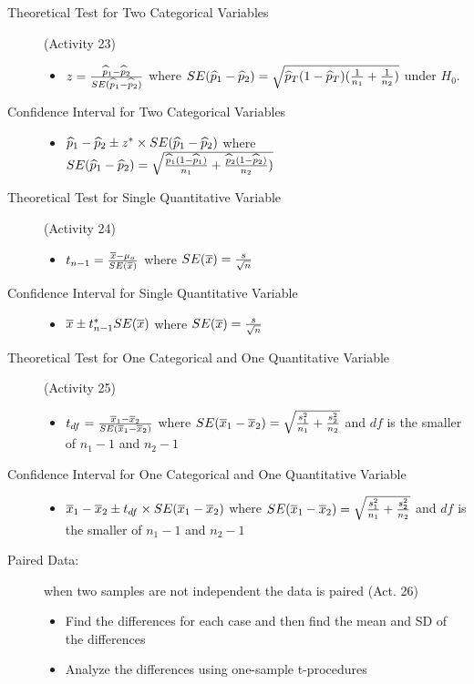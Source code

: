 \begin{description}
\item [Theoretical Test for Two Categorical Variables] (Activity 23)
  \begin{itemize}
  \item $z = \frac{\widehat{p}_1 - \widehat{p}_2}{SE(\widehat{p}_1-\widehat{p}_2)}$ where 
    $SE(\widehat{p}_1 - \widehat{p}_2) =
    \sqrt{\widehat{p}_T(1-\widehat{p}_T)(\frac{1}{n_1} + \frac{1}{n_2})}$ under $H_0$.
  \end{itemize}
\item [Confidence Interval for Two Categorical Variables]
   \begin{itemize}
  \item $\widehat{p}_1 - \widehat{p}_2 \pm z^*\times SE(\widehat{p}_1-\widehat{p}_2)$ where
    $SE(\widehat{p}_1 - \widehat{p}_2) = \sqrt{\frac{\widehat{p}_1(1-\widehat{p}_1)}{n_1} + \frac{\widehat{p}_2(1-\widehat{p}_2)}{n_2})}$ 
  \end{itemize}
\item [Theoretical Test for Single Quantitative Variable] (Activity
  24)
  \begin{itemize}
  \item $t_{n-1} = \frac{\overline{x} -\mu_o}{SE(\overline{x})} $ where $SE(\overline{x}) = \frac{s}{\sqrt{n}}$
  \end{itemize}
\item [Confidence Interval for Single Quantitative Variable]
  \begin{itemize}
  \item $\overline{x} \pm t^*_{n-1} SE(\overline{x})$ where $SE(\overline{x}) = \frac{s}{\sqrt{n}}$
  \end{itemize}

\item [Theoretical Test for One Categorical and One Quantitative
  Variable] (Activity 25)
  \begin{itemize}
  \item $t_{df} = \frac{\overline{x}_1 -\overline{x}_2}{SE(\overline{x}_1-\overline{x}_2)} $ where
    $SE(\overline{x}_1-\overline{x}_2) = \sqrt{\frac{s_1^2}{n_1} +
      \frac{s_2^2}{n_2}}$ and $df$ is the 
      smaller of $n_1-1$ and $n_2-1$
  \end{itemize}

\item [Confidence Interval for One Categorical and One Quantitative
  Variable]
  \begin{itemize}
  \item $\overline{x}_1 -\overline{x}_2 \pm t_{df}\times SE(\overline{x}_1-\overline{x}_2) $ where
    $SE(\overline{x}_1-\overline{x}_2) = \sqrt{\frac{s_1^2}{n_1} +
      \frac{s_2^2}{n_2}}$ and $df$ is the smaller of $n_1-1$ and $n_2-1$
  \end{itemize}


\item [Paired Data:] when two samples are not independent the data is
  paired (Act. 26) 
  \begin{itemize}
  \item Find the differences for each case and then find the mean and
    SD of the differences 
  \item Analyze the differences using one-sample t-procedures
  \end{itemize}
\end{description}
\newpage

\thispagestyle{empty}
\fancyhead{}
\begin{figure}[p]
    \vspace*{-1in}
\end{figure}
\thispagestyle{empty}